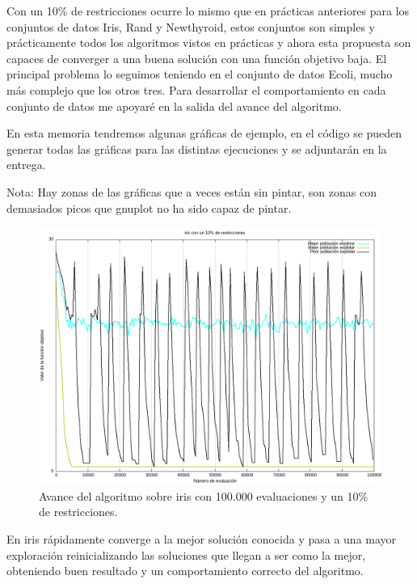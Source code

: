 \documentclass[12pt, spanish]{article}
\begin{document}
Con un 10\% de restricciones ocurre lo mismo que en prácticas anteriores para los conjuntos de datos Iris, Rand y Newthyroid, estos conjuntos son simples y prácticamente todos los algoritmos vistos en prácticas y ahora esta propuesta son capaces de converger a una buena solución con una función objetivo baja. El principal problema lo seguimos teniendo en el conjunto de datos Ecoli, mucho más complejo que los otros tres. Para desarrollar el comportamiento en cada conjunto de datos me apoyaré en la salida del avance del algoritmo.


En esta memoria tendremos algunas gráficas de ejemplo, en el código se pueden generar todas las gráficas para las distintas ejecuciones y se adjuntarán en la entrega.

Nota: Hay zonas de las gráficas que a veces están sin pintar, son zonas con demasiados picos que gnuplot no ha sido capaz de pintar.



\begin{figure}[H]
	\centering
	\includegraphics[scale = 0.5]{iris_1.png}
	
	\caption{Avance del algoritmo sobre iris con 100.000 evaluaciones y un 10\% de restricciones.}
	\label{fig:iris_1}
\end{figure}

En iris rápidamente converge a la mejor solución conocida y pasa a una mayor exploración reinicializando las soluciones que llegan a ser como la mejor, obteniendo buen resultado y un comportamiento correcto del algoritmo.
\end{document}
